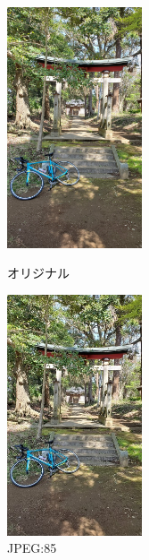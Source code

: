 \documentclass[a4paper,11pt]{bxjsarticle}
\begin{document}
  \begin{figure}[htbp]
    \begin{minipage}{0.5\hsize}
     \begin{center}
      \includegraphics[width=40mm]{sample.jpg}
     \end{center}
     \caption{オリジナル}
     \label{fig:jori}
    \end{minipage}
    \begin{minipage}{0.5\hsize}
     \begin{center}
      \includegraphics[width=40mm]{sample_j85.jpg}
     \end{center}
     \caption{JPEG:85}
     \label{fig:j85}
    \end{minipage}
   \end{figure}
\end{document}

